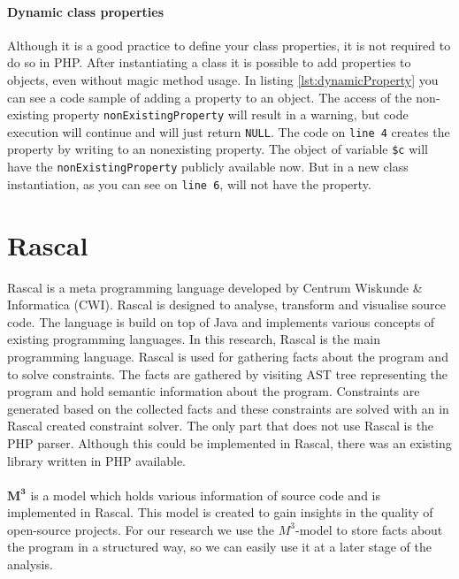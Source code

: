 \documentclass[../main.tex]{subfiles}
\begin{document}
	

    \paragraph{Dynamic class properties}
    Although it is a good practice to define your class properties, it is not required to do so in PHP.
    After instantiating a class it is possible to add properties to objects, even without magic method usage.
    In listing \ref{lst:dynamicProperty} you can see a code sample of adding a property to an object.
    The access of the non-existing property \texttt{nonExistingProperty} will result in a warning, but code execution will continue and will just return \texttt{NULL}.
    The code on \texttt{line 4} creates the property by writing to an nonexisting property.
    The object of variable \texttt{\$c} will have the \texttt{nonExistingProperty} publicly available now.
    But in a new class instantiation, as you can see on \texttt{line 6}, will not have the property.
    
    
    
    \section{Rascal}\label{sec:background_rascal}
    \Gls{Rascal}\cite{Kli:09} is a meta programming language developed by Centrum Wiskunde \& Informatica (CWI).
    Rascal is designed to analyse, transform and visualise source code.
    The language is build on top of Java and implements various concepts of existing programming languages.
    In this research, Rascal is the main programming language.
    Rascal is used for gathering facts about the program and to solve constraints.
    The facts are gathered by visiting AST tree representing the program and hold semantic information about the program.
    Constraints are generated based on the collected facts and these constraints are solved with an in Rascal created constraint solver.
    The only part that does not use Rascal is the PHP parser.
    Although this could be implemented in Rascal, there was an existing library written in PHP available.

    \paragraph{}
    $\pmb{M^3}$\cite{Ana:13,Bas:15} is a model which holds various information of source code and is implemented in Rascal.
    This model is created to gain insights in the quality of open-source projects.
    For our research we use the $M^3$-model to store facts about the program in a structured way, so we can easily use it at a later stage of the analysis.
    
\end{document}
